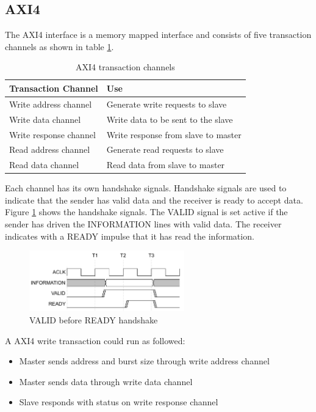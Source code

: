 \subsection{AXI4} \label{chapt:theory:axi4}
The AXI4 interface is a memory mapped interface and consists of five transaction
channels as shown in table
\ref{tab:axi4transchan}. 

\begin{table}[h]
    \centering
    \begin{tabular}{ l  l}
        \toprule
        Transaction Channel & Use \\
        \midrule
        Write address channel & Generate write requests to slave \\
        Write data channel & Write data to be sent to the slave \\
        Write response channel & Write response from slave to master \\
        Read address channel & Generate read requests to slave \\
        Read data channel & Read data from slave to master \\
        \bottomrule
    \end{tabular}
    \caption{AXI4 transaction channels}
    \label{tab:axi4transchan}
\end{table}

Each channel has its own handshake signals. Handshake signals are used to
indicate that the sender has valid data and the receiver is ready to accept
data. Figure \ref{fig:axihandshake} shows the handshake signals. The VALID
signal is set active if the sender has driven the INFORMATION lines with valid
data. The receiver indicates with a READY impulse that it has read the
information. 

\begin{figure}[h!]
    \centering
    \includegraphics[width=0.6\textwidth]{images/theory/axi4handshake.png}
    \caption{VALID before READY handshake \cite{axispecs}}
    \label{fig:axihandshake}
\end{figure}

A AXI4 write transaction could run as followed:
\begin{itemize}
    \item Master sends address and burst size through write address channel
    \item Master sends data through write data channel
    \item Slave responds with status on write response channel
\end{itemize}

